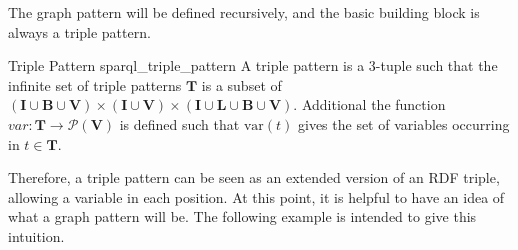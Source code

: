 The graph pattern will be defined recursively, and the basic building block is always a triple pattern.

\begin{Def}{Triple Pattern \cite{prudhommeaux2008sparql}}{sparql_triple_pattern}
A triple pattern is a 3-tuple such that the infinite set of triple patterns $\mathbf{T}$ is a subset of $(\mathbf{I} \cup \mathbf{B} \cup \mathbf{V}) \times  (\mathbf{I} \cup \mathbf{V}) \times (\mathbf{I} \cup \mathbf{L} \cup \mathbf{B} \cup \mathbf{V})$. Additional the function $var: \mathbf{T} \to \mathcal{P}(\mathbf{V})$ is defined such that $\text{var}(t)$ gives the set of variables occurring in $t \in \mathbf{T}$. 
\end{Def}

Therefore, a triple pattern can be seen as an extended version of an RDF triple, allowing a variable in each position. At this point, it is helpful to have an idea of what a graph pattern will be. The following example is intended to give this intuition.

